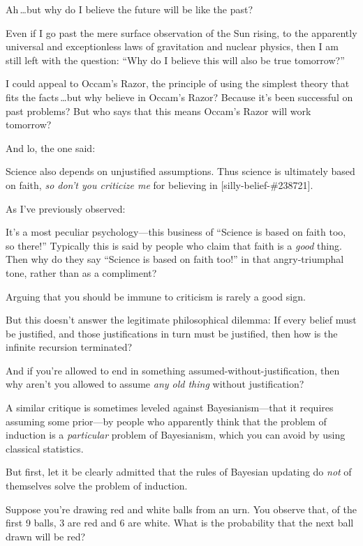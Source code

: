  Ah\,\ldots but why do I believe the future will be like the past?


 Even if I go past the mere surface observation of the Sun rising,
to the apparently universal and exceptionless laws of gravitation and
nuclear physics, then I am still left with the question:
``Why do I believe this will also be true
tomorrow?''


 I could appeal to Occam's Razor, the principle of
using the simplest theory that fits the facts\,\ldots but why believe in
Occam's Razor? Because it's been
successful on past problems? But who says that this means
Occam's Razor will work tomorrow?


 And lo, the one said:

{
 Science also depends on unjustified assumptions. Thus science is
ultimately based on faith, \textit{so don't you
criticize me} for believing in [silly-belief-\#238721].}


 As I've previously observed:


 It's a most peculiar psychology---this business of
``Science is based on faith too, so
there!'' Typically this is said by people who claim
that faith is a \textit{good} thing. Then why do they say
``Science is based on faith too!''
in that angry-triumphal tone, rather than as a compliment?


 Arguing that you should be immune to criticism is rarely a good
sign.


 But this doesn't answer the legitimate
philosophical dilemma: If every belief must be justified, and those
justifications in turn must be justified, then how is the infinite
recursion terminated?


 And if you're allowed to end in something
assumed-without-justification, then why aren't you
allowed to assume \textit{any old thing} without justification?


 A similar critique is sometimes leveled against Bayesianism---that
it requires assuming some prior---by people who apparently think that
the problem of induction is a \textit{particular} problem of
Bayesianism, which you can avoid by using classical statistics.


 But first, let it be clearly admitted that the rules of Bayesian
updating do \textit{not} of themselves solve the problem of induction.


 Suppose you're drawing red and white balls from an
urn. You observe that, of the first 9 balls, 3 are red and 6 are white.
What is the probability that the next ball drawn will be red?


